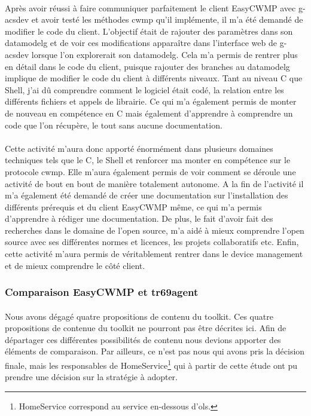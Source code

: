 \documentclass[12pt,a4paper]{report}
\begin{document}
\paragraph*{}Après avoir réussi à faire communiquer parfaitement le client EasyCWMP avec g-acsdev et avoir testé les méthodes \gls{cwmp} qu’il implémente, il m’a été demandé de modifier le code du client. L’objectif était de rajouter des paramètres dans son \gls{datamodelg} et de voir ces modifications apparaître dans l’interface web de g-acsdev lorsque l'on explorerait son \gls{datamodelg}. Cela m’a permis de rentrer plus en détail dans le code du client, puisque rajouter des branches au \gls{datamodelg} implique de modifier le code du client à différents niveaux. Tant au niveau C que Shell, j’ai dû comprendre comment le logiciel était codé, la relation entre les différents fichiers et appels de librairie. Ce qui m’a également permis de monter de nouveau en compétence en C mais également d’apprendre à comprendre un code que l’on récupère, le tout sans aucune documentation.
\paragraph*{}Cette activité m’aura donc apporté énormément dans plusieurs domaines techniques tels que le C, le Shell et renforcer ma monter en compétence sur le protocole \gls{cwmp}. Elle m’aura également permis de voir comment se déroule une activité de bout en bout de manière totalement autonome. A la fin de l’activité il m’a également été demandé de créer une documentation sur l’installation des différents prérequis et du client EasyCWMP même, ce qui m’a permis d’apprendre à rédiger une documentation. De plus, le fait d’avoir fait des recherches dans le domaine de l’open source, m’a aidé à mieux comprendre l’open source avec ses différentes normes et licences, les projets collaboratifs etc. Enfin, cette activité m’aura permis de véritablement rentrer dans le device management et de mieux comprendre le côté client. \\
\subsubsection{Comparaison EasyCWMP et tr69agent}
\paragraph*{}Nous avons dégagé quatre propositions de contenu du toolkit. Ces quatre propositions de contenue du toolkit ne pourront pas être décrites ici. Afin de départager ces différentes possibilités de contenu nous devions apporter des éléments de comparaison. Par ailleurs, ce n’est pas nous qui avons pris la décision finale, mais les responsables de HomeService\footnote{HomeService correspond au service en-dessous d'\gls{ols}.} qui à partir de cette étude ont pu prendre une décision sur la stratégie à adopter.
\end{document}
